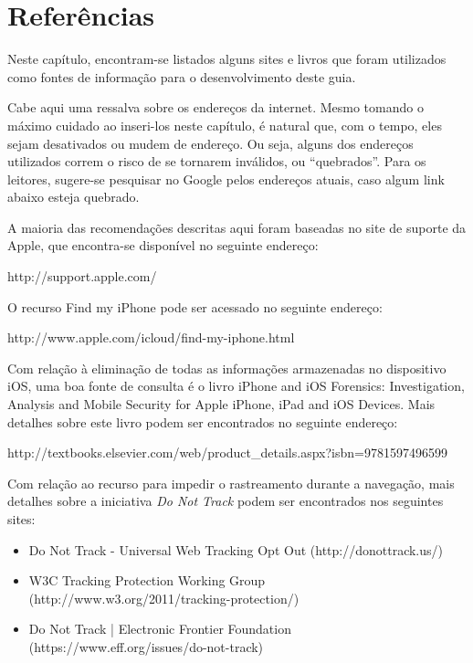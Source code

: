 \chapter{Refer\^encias}

Neste cap\'itulo, encontram-se listados alguns sites e livros que foram utilizados como fontes de informa\c c\~ao para o desenvolvimento deste guia. 

Cabe aqui uma ressalva sobre os endere\c cos da internet. Mesmo tomando o m\'aximo cuidado ao inseri-los neste cap\'itulo, \'e natural que, com o tempo, eles sejam desativados ou mudem de endere\c co. Ou seja, alguns dos endere\c cos utilizados correm o risco de se tornarem inv\'alidos, ou ``quebrados''. Para os leitores, sugere-se pesquisar no Google pelos endere\c cos atuais, caso algum link abaixo esteja quebrado. 

A maioria das recomenda\c c\~oes descritas aqui foram baseadas no site de suporte da Apple, que encontra-se dispon\'ivel no seguinte endere\c co:

\vspace{5mm}
http://support.apple.com/
\vspace{5mm}

O recurso Find my iPhone pode ser acessado no seguinte endere\c co:

\vspace{5mm}
http://www.apple.com/icloud/find-my-iphone.html
\vspace{5mm}

Com rela\c c\~ao \`a elimina\c c\~ao de todas as informa\c c\~oes armazenadas no dispositivo iOS, uma boa fonte de consulta \'e o livro iPhone and iOS Forensics: Investigation, Analysis and Mobile Security for Apple iPhone, iPad and iOS Devices. Mais detalhes sobre este livro podem ser encontrados no seguinte endere\c co:

\vspace{5mm}
http://textbooks.elsevier.com/web/product\_details.aspx?isbn=9781597496599
\vspace{5mm}

Com rela\c c\~ao ao recurso para impedir o rastreamento durante a navega\c c\~ao, mais detalhes sobre a iniciativa \textit{Do Not Track} podem ser encontrados nos seguintes sites: 

\begin{itemize}
\item Do Not Track - Universal Web Tracking Opt Out (http://donottrack.us/)
\item W3C Tracking Protection Working Group (http://www.w3.org/2011/tracking-protection/)
\item Do Not Track | Electronic Frontier Foundation (https://www.eff.org/issues/do-not-track)
\end{itemize}
